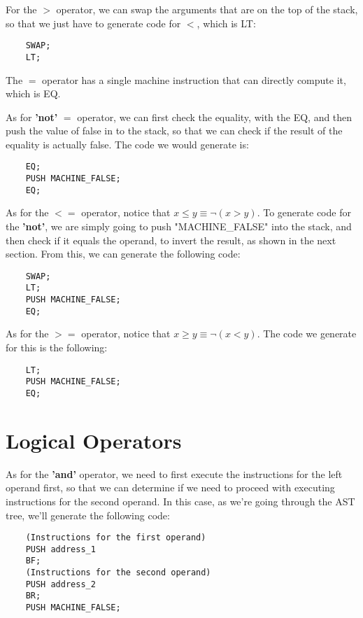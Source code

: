 \documentclass{article}
\begin{document}
For the $>$ operator, we can swap the arguments that are on the top of the stack, so that we just have to generate code for $<$, which is LT:

\begin{lstlisting}
    SWAP;
    LT;
\end{lstlisting}

The $=$ operator has a single machine instruction that can directly compute it, which is EQ.

As for \textbf{'not'} $=$ operator, we can first check the equality, with the EQ, and then push the value of false in to the stack, so that we can check if the result of the equality is actually false. The code we would generate is:

\begin{lstlisting}
    EQ;
    PUSH MACHINE_FALSE;
    EQ;
\end{lstlisting}

As for the $<=$ operator, notice that $x \leq y \equiv \lnot(x > y)$. To generate code for the \textbf{'not'}, we are simply going to push 
"MACHINE\_FALSE" into the stack, and then check if it equals the operand, to invert the result, as shown in the next section. From this, we can generate the following code:

\begin{lstlisting}
    SWAP;
    LT;
    PUSH MACHINE_FALSE;
    EQ;
\end{lstlisting}

As for the $>=$ operator, notice that $x \geq y \equiv \lnot(x < y)$. The code we generate for this is the following:

\begin{lstlisting}
    LT;
    PUSH MACHINE_FALSE;
    EQ;
\end{lstlisting}

\section{Logical Operators}

As for the \textbf{'and'} operator, we need to first execute the instructions for the left operand first, so that we can determine if we need to proceed with executing instructions for the second operand. In this case, as we're going through the AST tree, we'll generate the following code:

\begin{lstlisting}
    (Instructions for the first operand)
    PUSH address_1
    BF;
    (Instructions for the second operand)
    PUSH address_2
    BR;
    PUSH MACHINE_FALSE;
\end{lstlisting}
\end{document}
